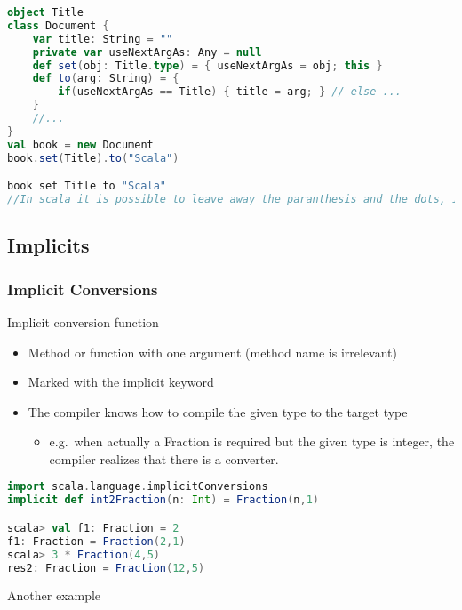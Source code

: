 \begin{lstlisting}[language=scala,mathescape=false]
object Title
class Document {
    var title: String = ""
    private var useNextArgAs: Any = null
    def set(obj: Title.type) = { useNextArgAs = obj; this }
    def to(arg: String) = {
        if(useNextArgAs == Title) { title = arg; } // else ...
    }
    //...
}
val book = new Document
book.set(Title).to("Scala")

book set Title to "Scala"
//In scala it is possible to leave away the paranthesis and the dots, if there is only one parameter.
\end{lstlisting}

\clearpage
\hypertarget{implicits}{%
\subsection{Implicits}\label{implicits}}

\hypertarget{implicit-conversions}{%
\subsubsection{Implicit Conversions}\label{implicit-conversions}}

Implicit conversion function

\begin{itemize}
\tightlist
\item
  Method or function with one argument (method name is irrelevant)
\item
  Marked with the implicit keyword
\item
  The compiler knows how to compile the given type to the target type

  \begin{itemize}
  \tightlist
  \item
    e.g.~when actually a Fraction is required but the given type is
    integer, the compiler realizes that there is a converter.
  \end{itemize}
\end{itemize}

\begin{lstlisting}[language=scala,mathescape=false]
import scala.language.implicitConversions
implicit def int2Fraction(n: Int) = Fraction(n,1)

scala> val f1: Fraction = 2
f1: Fraction = Fraction(2,1)
scala> 3 * Fraction(4,5)
res2: Fraction = Fraction(12,5)
\end{lstlisting}

Another example

